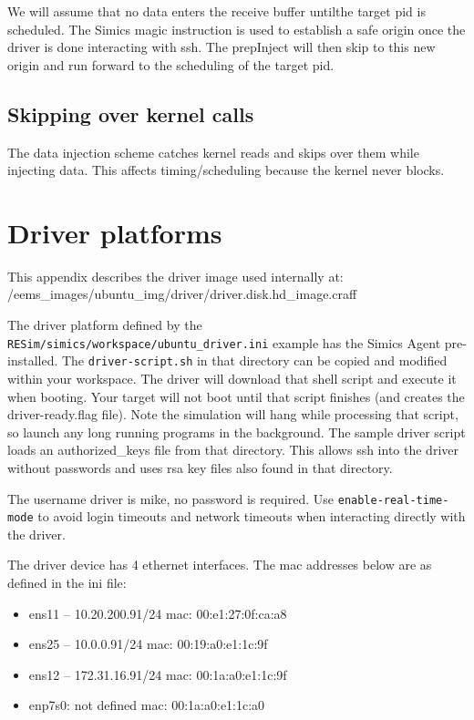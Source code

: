 \documentclass[titlepage]{article}
\begin{document}
\begin{appendices}
We will assume that no data enters the receive buffer untilthe target pid is scheduled.  The Simics magic instruction is used to establish a safe origin
once the driver is done interacting with ssh.  The prepInject will then skip to this new origin and run forward to the scheduling of the target pid.

\subsection{Skipping over kernel calls}
The data injection scheme catches kernel reads and skips over them while injecting data.  This affects timing/scheduling because the kernel never
blocks.

\section{Driver platforms}
\label{driver}
This appendix describes the driver image used internally at: /eems\_images/ubuntu\_img/driver/driver.disk.hd\_image.craff

The driver platform defined by the {\tt RESim/simics/workspace/ubuntu\_driver.ini} example has the Simics Agent pre-installed.  The
{\tt driver-script.sh} in that directory can be copied and modified within your workspace.  The driver will download that shell script and execute
it when booting.  Your target will not boot until that script finishes (and creates the driver-ready.flag file).
Note the simulation will hang while processing that script, so launch any long running programs in the background.
The sample driver script loads an authorized\_keys file from that directory.  This allows ssh into the driver without passwords and uses
rsa key files also found in that directory.

The username driver is mike, no password is required.  Use {\tt enable-real-time-mode} to avoid login timeouts and network timeouts when
interacting directly with the driver.  

The driver device has 4 ethernet interfaces.  The mac addresses below are as defined in the ini file:
\begin{itemize}
\item ens11 -- 10.20.200.91/24  mac: 00:e1:27:0f:ca:a8
\item ens25 -- 10.0.0.91/24     mac: 00:19:a0:e1:1c:9f
\item ens12 -- 172.31.16.91/24  mac: 00:1a:a0:e1:1c:9f
\item enp7s0:  not defined      mac: 00:1a:a0:e1:1c:a0 
\end{itemize}


\end{appendices}
\end{document}
